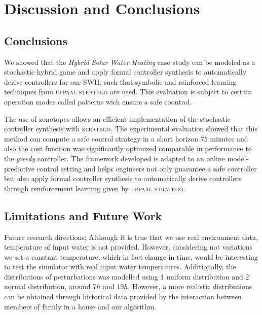 \chapter{Discussion and Conclusions}
\label{ch:conclusions}

\section{Conclusions}
\label{sec:conclusions}
We showed that the \emph{Hybrid Solar Water Heating} case study can 
be modeled as a stochastic hybrid game and apply formal 
controller synthesis to automatically derive controllers 
for our \ac{SWH}, such that symbolic and reinforced learning 
techniques from \textsc{uppaal stratego} are used. This evaluation 
is subject to certain operation modes called patterns wich ensure 
a safe coontrol.

The use of zonotopes allows an efficient implementation of the 
stochastic controller synthesis with \textsc{stratego}. The experimental
 evaluation showed that this method can compute a safe control strategy 
 in a short horizon $75$ minutes and also the cost function was 
 significantly optimized comparable in performance to the \emph{greedy} 
 controller. The  framework developed is adapted to an online 
 model-predictive control setting and helps engineers not only guarantee 
 a  safe controller  but also apply formal controller synthesis to 
 automatically derive controllers through reinforcement learning given
by \textsc{uppaal stratego}.

\section{Limitations and Future Work}
\label{sec:limitations}

Future research directions; Although it is true that we use
real environment data, temperature of input water is not provided. However,
considering not variations we set a constant temperature, which in fact 
change in time, would be interesting to test the simulator with real 
input water temperatures. Additionally, the distributions of perturbations
was modelled using 1 uniform distribution and 2 normal distribution, 
around $7h$ and $19h$. However, a more realistic distributions can be 
obtained through historical data provided by the interaction
between members of family in a house and our algorithm.


